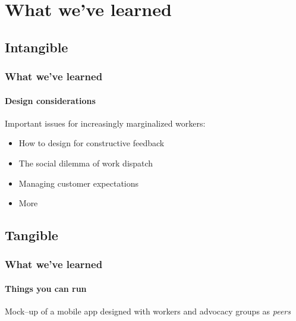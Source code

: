 \documentclass{beamer}
\begin{document}
\section[Lessons]{What we've learned}

\subsection[]{Intangible}
\begin{frame}
  \frametitle{What we've learned}
  \framesubtitle{Design considerations}
  Important issues for increasingly marginalized workers:
  \begin{itemize}
    \item How to design for constructive feedback
    \item The social dilemma of work dispatch
    \item Managing customer expectations
    \item More
  \end{itemize}
\end{frame}

\subsection[]{Tangible}
\begin{frame}
  \frametitle{What we've learned}
  \framesubtitle{Things you can run}
  Mock--up of a mobile app designed with workers and advocacy groups as \textit{peers}
\end{frame}
\end{document}

